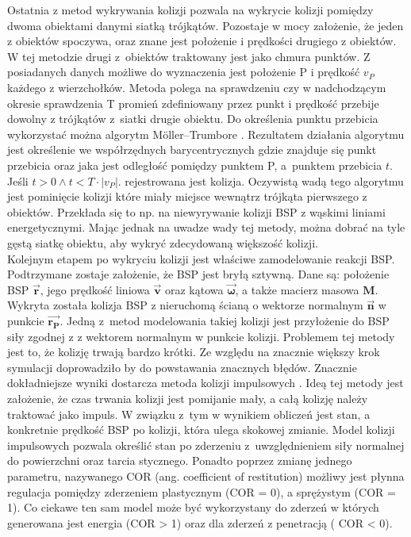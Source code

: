 Ostatnia z metod wykrywania kolizji pozwala na wykrycie kolizji pomiędzy dwoma obiektami danymi siatką trójkątów. Pozostaje w mocy założenie, że jeden z obiektów spoczywa, oraz znane jest położenie i prędkości drugiego z obiektów. W tej metodzie drugi z~obiektów traktowany jest jako chmura punktów. Z posiadanych danych możliwe do wyznaczenia jest położenie P i prędkość $v_P$ każdego z wierzchołków. Metoda polega na sprawdzeniu czy w nadchodzącym okresie sprawdzenia T promień zdefiniowany przez punkt i prędkość przebije dowolny z trójkątów z~siatki drugie obiektu. Do określenia punktu przebicia wykorzystać można algorytm Möller–Trumbore \cite{ray_intersaction}. Rezultatem działania algorytmu jest określenie we współrzędnych barycentrycznych gdzie znajduje się punkt przebicia oraz jaka jest odległość pomiędzy punktem P, a~punktem przebicia $t$. Jeśli $t > 0 \land t < T\cdot |v_P|$. rejestrowana jest kolizja. Oczywistą wadą tego algorytmu jest pominięcie kolizji które miały miejsce wewnątrz trójkąta pierwszego z obiektów. Przekłada się to np. na niewyrywanie kolizji BSP z wąskimi liniami energetycznymi. Mając jednak na uwadze wady tej metody, można dobrać na tyle gęstą siatkę obiektu, aby wykryć zdecydowaną większość kolizji.\\


Kolejnym etapem po wykryciu kolizji jest właściwe zamodelowanie reakcji BSP. Podtrzymane zostaje założenie, że BSP jest bryłą sztywną.  Dane są: położenie BSP $\bm{\vec{r}}$, jego prędkość liniowa $\bm{\vec{v}}$ oraz kątowa $\bm{\vec{\omega}}$, a także macierz masowa $\bm{M}$. Wykryta została kolizja BSP z nieruchomą ścianą o wektorze normalnym $\bm{\vec{n}}$ w punkcie $\bm{\vec{r_P}}$. Jedną z~metod modelowania takiej kolizji jest przyłożenie do BSP siły zgodnej z z wektorem normalnym w punkcie kolizji. Problemem tej metody jest to, że kolizję trwają bardzo krótki. Ze względu na znacznie większy krok symulacji doprowadziło by do powstawania znacznych błędów. Znacznie dokładniejsze wyniki dostarcza metoda kolizji impulsowych \cite{impulse_collision}. Ideą tej metody jest założenie, że czas trwania kolizji jest pomijanie mały, a całą kolizję należy traktować jako impuls. W związku z~tym w wynikiem obliczeń jest stan, a konkretnie prędkość BSP po kolizji, która ulega skokowej zmianie. Model kolizji impulsowych pozwala określić stan po zderzeniu z~uwzględnieniem siły normalnej do powierzchni oraz tarcia stycznego. Ponadto poprzez zmianę jednego parametru, nazywanego COR (ang. coefficient of restitution) możliwy jest płynna regulacja pomiędzy zderzeniem plastycznym (COR = 0), a sprężystym (COR = 1). Co ciekawe ten sam model może być wykorzystany do zderzeń w których generowana jest energia (COR > 1) oraz dla zderzeń z penetracją ( COR < 0).\\

